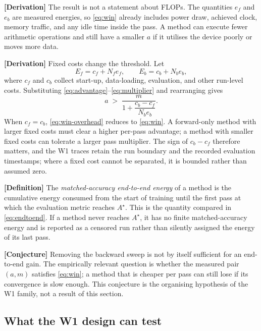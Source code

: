 \textbf{[Derivation]} The result is not a statement about FLOPs.  The
quantities $e_f$ and $e_b$ are measured energies, so \eqref{eq:win}
already includes power draw, achieved clock, memory traffic, and any idle time
inside the pass.  A method can execute fewer arithmetic operations and still
have a smaller $a$ if it utilises the device poorly or moves more data.

\textbf{[Derivation]} Fixed costs change the threshold.  Let
\begin{equation}
  E_f = c_f + N_f e_f,
  \qquad
  E_b = c_b + N_b e_b,
  \label{eq:overhead}
\end{equation}
where $c_f$ and $c_b$ collect start-up, data-loading, evaluation, and other
run-level costs.  Substituting \eqref{eq:advantage}--\eqref{eq:multiplier} and
rearranging gives
\begin{equation}
  a \;>\; \frac{m}
  {1 + \dfrac{c_b-c_f}{N_b e_b}} .
  \label{eq:win-overhead}
\end{equation}
When $c_f=c_b$, \eqref{eq:win-overhead} reduces to \eqref{eq:win}.  A
forward-only method with larger fixed costs must clear a higher per-pass
advantage; a method with smaller fixed costs can tolerate a larger pass
multiplier.  The sign of $c_b-c_f$ therefore matters, and the W1 traces retain
the run boundary and the recorded evaluation timestamps; where a fixed cost
cannot be separated, it is bounded rather than assumed zero.

\textbf{[Definition]} The \emph{matched-accuracy end-to-end energy} of a method
is the cumulative energy consumed from the start of training until the first
pass at which the evaluation metric reaches $A^\star$.  This is the quantity
compared in \eqref{eq:endtoend}.  If a method never reaches $A^\star$, it has no
finite matched-accuracy energy and is reported as a censored run rather than
silently assigned the energy of its last pass.

\textbf{[Conjecture]} Removing the backward sweep is not by itself sufficient
for an end-to-end gain.  The empirically relevant question is whether the
measured pair $(a,m)$ satisfies \eqref{eq:win}; a method that is cheaper per
pass can still lose if its convergence is slow enough.  This conjecture is the
organising hypothesis of the W1 family, not a result of this section.

\subsection{What the W1 design can test}

